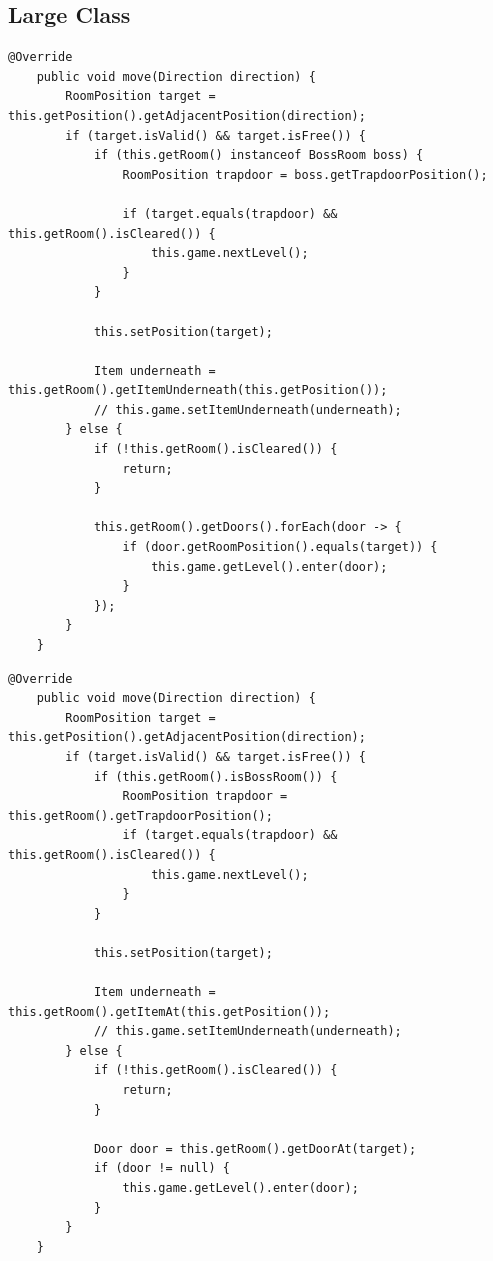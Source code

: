 \subsection*{Large Class}
\vspace{0.5cm}
\begin{lstlisting}[caption={Code Smell I (Vorher)}]
    @Override
    public void move(Direction direction) {
        RoomPosition target = this.getPosition().getAdjacentPosition(direction);
        if (target.isValid() && target.isFree()) {
            if (this.getRoom() instanceof BossRoom boss) {
                RoomPosition trapdoor = boss.getTrapdoorPosition();
                
                if (target.equals(trapdoor) && this.getRoom().isCleared()) {
                    this.game.nextLevel();
                }
            }
            
            this.setPosition(target);
            
            Item underneath = this.getRoom().getItemUnderneath(this.getPosition());
            // this.game.setItemUnderneath(underneath);
        } else {
            if (!this.getRoom().isCleared()) {
                return;
            }
            
            this.getRoom().getDoors().forEach(door -> {
                if (door.getRoomPosition().equals(target)) {
                    this.game.getLevel().enter(door);
                }
            });
        }
    }
\end{lstlisting}

\vspace{0.5cm}
\begin{lstlisting}[caption={Code Smell I (Nachher)}]
    @Override
    public void move(Direction direction) {
        RoomPosition target = this.getPosition().getAdjacentPosition(direction);
        if (target.isValid() && target.isFree()) {
            if (this.getRoom().isBossRoom()) {
                RoomPosition trapdoor = this.getRoom().getTrapdoorPosition();
                if (target.equals(trapdoor) && this.getRoom().isCleared()) {
                    this.game.nextLevel();
                }
            }
            
            this.setPosition(target);
            
            Item underneath = this.getRoom().getItemAt(this.getPosition());
            // this.game.setItemUnderneath(underneath);
        } else {
            if (!this.getRoom().isCleared()) {
                return;
            }
            
            Door door = this.getRoom().getDoorAt(target);
            if (door != null) {
                this.game.getLevel().enter(door);
            }
        }
    }
\end{lstlisting}


